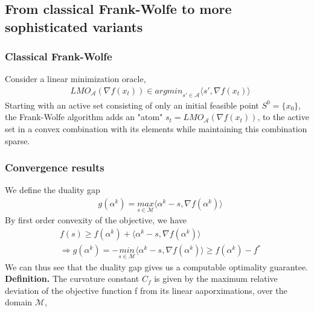 \subsection{From classical Frank-Wolfe to more sophisticated variants}
\subsubsection{Classical Frank-Wolfe}
Consider a linear minimization oracle,
\begin{equation*}
\begin{aligned}
    &LMO_{\mathcal{A}}(\nabla f(x_{t}))\in \textit{argmin}_{s\prime\in\mathcal{A}}\langle s\prime, \nabla f(x_{t})\rangle
\end{aligned}
\end{equation*}
Starting with an active set consisting of only an initial feasible point $S^{0}=
\{x_{0}\}$, the Frank-Wolfe algorithm adds an "atom" $s_{t}=
LMO_{\mathcal{A}}(\nabla f(x_{t}))$, to the active set in a convex combination
with its elements while maintaining this combination sparse.
\subsubsection{Convergence results}
We define the duality gap
\begin{equation*}
\begin{aligned}
    &g(\alpha^{k})= \underset{s\in\mathcal{M}}{\textit{max}}\langle \alpha^{k}-s, \nabla f(\alpha^{k})\rangle
\end{aligned}
\end{equation*}
By first order convexity of the objective, we have
\begin{equation*}
\begin{aligned}
    &f(s)\geq f(\alpha^{k})+ \langle \alpha^{k}-s, \nabla f(\alpha^{k})\rangle\\
    &\Longrightarrow g(\alpha^{k})= -\underset{s\in\mathcal{M}}{\textit{min}}\langle \alpha^{k}-s, \nabla f(\alpha^{k})\rangle \geq f(\alpha^{k})- f^{*}
\end{aligned}
\end{equation*}
We can thus see that the duality gap gives us a computable optimality guarantee. \\

\textbf{Definition.} The curvature constant $C_{f}$ is given by the maximum relative deviation of the objective function f from its linear aaporximations, over the domain $\mathcal{M}$,

